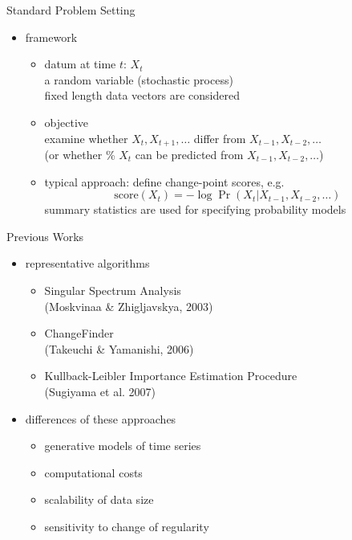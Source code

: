 \documentclass[fleqn,aspectratio=1610]{beamer}
\begin{document}
\begin{frame}[label={sec:orga82dbae}]{Standard Problem Setting}
\begin{itemize}
\item framework
\begin{itemize}
\item datum at time \(t\):  \(X_t\)\\[0pt]
a random variable (stochastic process)\\[0pt]
\alert{fixed length data vectors are considered}
\item objective \\[0pt]
examine whether \(X_t,X_{t+1},\dotsc\) differ from
\(X_{t-1},X_{t-2},\dotsc\) \\[4pt]
(or whether \%
\(X_t\) can be predicted from \(X_{t-1},X_{t-2},\dotsc\))
\item typical approach: define change-point scores, e.g.
\begin{equation}
  \mathrm{score}(X_t)=-\log\Pr(X_t|X_{t-1},X_{t-2},\dotsc)
\end{equation}
\alert{summary statistics are used for specifying probability models}
\end{itemize}
\end{itemize}
\end{frame}

\begin{frame}[label={sec:org34f2c28}]{Previous Works}
\begin{itemize}
\item representative algorithms
\begin{itemize}
\item Singular Spectrum Analysis \\[0pt]
(Moskvinaa \& Zhigljavskya, 2003) \nocite{MoskvinaZhigljavsky2003}
\item ChangeFinder \\[0pt]
(Takeuchi \& Yamanishi, 2006) \nocite{TakeuchiYamanishi2006}
\item Kullback-Leibler Importance Estimation Procedure \\[0pt]
(Sugiyama et al. 2007) \nocite{Sugiyama_etal2007nips}
\end{itemize}
\item differences of these approaches
\begin{itemize}
\item generative models of time series
\item computational costs
\item scalability of data size
\item sensitivity to change of regularity
\end{itemize}
\end{itemize}
\end{frame}
\end{document}

